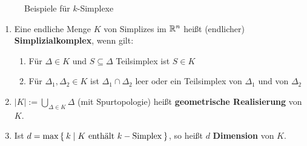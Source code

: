 \begin{figure}[ht]
    \centering

    \label{fig:k-simplexe}
    \caption{Beispiele für $k$-Simplexe}
\end{figure}


\begin{definition}%
    \begin{enumerate}[label=\alph*),ref=\thedefinition.\alph*]
        \item Eine endliche Menge $K$ von Simplizes im $\mathbb{R}^n$
              heißt (endlicher) \textbf{Simplizialkomplex},
              wenn gilt:
            \begin{enumerate}[label=(\roman*),ref=\theenumii.\roman*]
                \item Für $\Delta \in K$ und $S \subseteq \Delta$ Teilsimplex
                      ist $S \in K$
                \item Für $\Delta_1, \Delta_2 \in K$ ist 
                      $\Delta_1 \cap \Delta_2$ leer oder ein 
                        Teilsimplex von $\Delta_1$ und von 
                      $\Delta_2$ \label{def:simplizialkomplex.ii}
            \end{enumerate}
        \item $|K| := \bigcup_{\Delta \in K} \Delta$ (mit Spurtopologie)
              heißt \textbf{geometrische Realisierung}
              von $K$.
        \item Ist $d = \max \Set{ k | K \text{ enthält } k-\text{Simplex}}$,
              so heißt $d$ \textbf{Dimension} von
              $K$.
    \end{enumerate}
\end{definition}

